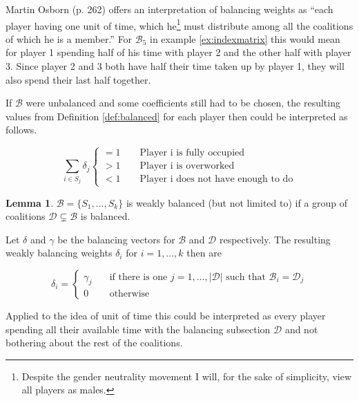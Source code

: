 \documentclass[10pt,a4paper,titlepage]{article}
\theoremstyle{plain}
\theoremstyle{definition}
\newtheorem{lemma}[thm]{Lemma}
\begin{document}
Martin Osborn\cite{osborne} (p. 262) offers an interpretation of balancing weights as \enquote{each player having one unit of time, which he\footnote{Despite the gender neutrality movement I will, for the sake of simplicity, view all players as males.} must distribute among all the coalitions of which he is a member.} For $\mathcal{B}_5$ in example \ref{ex:indexmatrix} this would mean for player 1 spending half of his time with player 2 and the other half with player 3. Since player 2 and 3 both have half their time taken up by player 1, they will also spend their last half together.

If $\mathcal{B}$ were unbalanced and some coefficients still had to be chosen, the resulting values from Definition \ref{def:balanced} for each player then could be interpreted as follows.\vspace{-15pt}

\begin{equation*}
    \sum_{i \in S_j} \delta_j
    \begin{cases}
        = 1\qquad \text{Player i is fully occupied}\\
        > 1\qquad \text{Player i is overworked}\\
        < 1\qquad \text{Player i does not have enough to do}
    \end{cases}
\end{equation*}

\begin{lemma}\label{lem:weaklybalanced}
    $\mathcal{B} = \{S_1,..., S_k\}$ is weakly balanced (but not limited to) if a group of coalitions $\mathcal{D} \subsetneq \mathcal{B}$ is balanced.

    Let $\delta$ and $\gamma$ be the balancing vectors for $\mathcal{B}$ and $\mathcal{D}$ respectively. The resulting weakly balancing weights $\delta_i$ for $i = 1, ..., k$ then are
    
    \begin{equation*}
        \delta_i =
        \begin{cases}
            \gamma_j & \quad\text{if there is one } j = 1, ..., |\mathcal{D}| \text{ such that }\mathcal{B}_i = \mathcal{D}_j\\
            0 & \quad\text{otherwise}
        \end{cases}
    \end{equation*}
\end{lemma}

Applied to the idea of unit of time this could be interpreted as every player spending all their available time with the balancing subsection $\mathcal{D}$ and not bothering about the rest of the coalitions.
\end{document}
